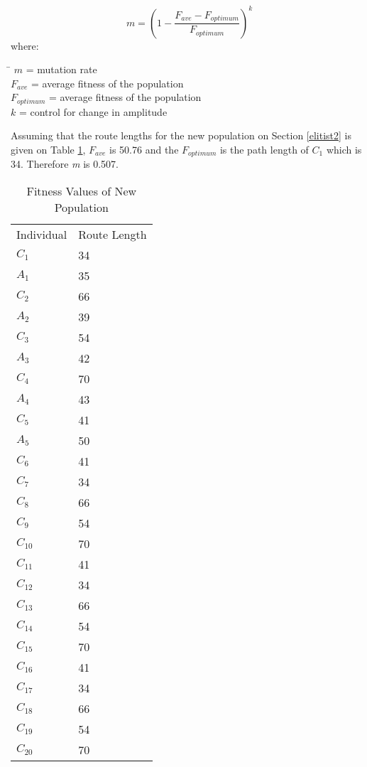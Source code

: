 \begin{equation} \label{DynamicMutation2}
	m = (1 -\frac{F_{ave} - F_{optimum}}{F_{optimum}})^k
\end{equation}
where:
\begin{tabbing}
	\= \kill
	$m$\> = mutation rate\\
	$F_{ave}$\> = average fitness of the population\\
	$F_{optimum}$ = average fitness of the population\\
	$k$\> = control for change in amplitude\\
\end{tabbing}
Assuming that the route lengths for the new population on Section \ref{elitist2} is given on Table \ref{table:FitnessValOfNewPop}, $F_{ave}$ is 50.76 and the $F_{optimum}$ is the path length of $C_1$ which is 34. Therefore \emph{m} is 0.507.
\begin{table}[H]
	\begin{center}
		\begin{tabular}{ll}
			Individual & Route Length \\
			$C_{1}$          & 34     \\
			$A_{1}$         & 35  \\
			$C_{2}$          & 66   \\
			$A_{2}$         & 39    \\
			$C_{3}$          & 54 \\
			$A_{3}$          & 42    \\
			$C_{4}$          & 70 \\
			$A_{4}$          & 43   \\
			$C_{5}$         & 41   \\
			$A_{5}$         & 50    \\
			$C_{6}$         & 41   \\       
			$C_{7}$          & 34     \\
			$C_{8}$          & 66   \\
			$C_{9}$          & 54 \\
			$C_{10}$          & 70 \\
			$C_{11}$         & 41   \\       
			$C_{12}$          & 34     \\
			$C_{13}$          & 66   \\
			$C_{14}$          & 54 \\
			$C_{15}$          & 70 \\
			$C_{16}$         & 41   \\       
			$C_{17}$          & 34     \\
			$C_{18}$          & 66   \\
			$C_{19}$          & 54 \\
			$C_{20}$          & 70 \\
		\end{tabular}
		\caption{Fitness Values of New Population}
		\label{table:FitnessValOfNewPop}
	\end{center}
\end{table}

